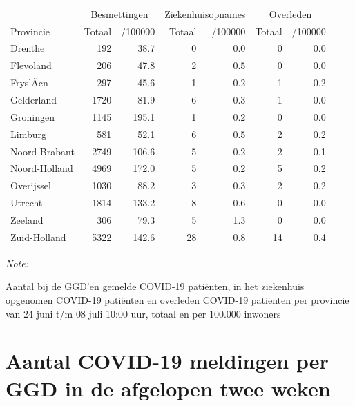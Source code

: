 \documentclass[
  english,
  man,floatsintext]{apa6}
\begin{document}
\begin{table}
\centering
\begin{threeparttable}
\begin{tabular}{lrrrrrr}
\toprule
\multicolumn{1}{c}{ } & \multicolumn{2}{c}{Besmettingen} & \multicolumn{2}{c}{Ziekenhuisopnames} & \multicolumn{2}{c}{Overleden} \\
\cmidrule(l{3pt}r{3pt}){2-3} \cmidrule(l{3pt}r{3pt}){4-5} \cmidrule(l{3pt}r{3pt}){6-7}
Provincie & Totaal & /100000 & Totaal & /100000 & Totaal & /100000\\
\midrule
Drenthe & 192 & 38.7 & 0 & 0.0 & 0 & 0.0\\
Flevoland & 206 & 47.8 & 2 & 0.5 & 0 & 0.0\\
FryslÃ¢n & 297 & 45.6 & 1 & 0.2 & 1 & 0.2\\
Gelderland & 1720 & 81.9 & 6 & 0.3 & 1 & 0.0\\
Groningen & 1145 & 195.1 & 1 & 0.2 & 0 & 0.0\\
Limburg & 581 & 52.1 & 6 & 0.5 & 2 & 0.2\\
Noord-Brabant & 2749 & 106.6 & 5 & 0.2 & 2 & 0.1\\
Noord-Holland & 4969 & 172.0 & 5 & 0.2 & 5 & 0.2\\
Overijssel & 1030 & 88.2 & 3 & 0.3 & 2 & 0.2\\
Utrecht & 1814 & 133.2 & 8 & 0.6 & 0 & 0.0\\
Zeeland & 306 & 79.3 & 5 & 1.3 & 0 & 0.0\\
Zuid-Holland & 5322 & 142.6 & 28 & 0.8 & 14 & 0.4\\
\bottomrule
\end{tabular}
\begin{tablenotes}
\item \textit{Note: } 
\item Aantal bij de GGD’en gemelde COVID-19 patiënten, in het ziekenhuis opgenomen COVID-19 patiënten en overleden COVID-19 patiënten per provincie van 24 juni t/m 08 juli 10:00 uur, totaal en per 100.000 inwoners
\end{tablenotes}
\end{threeparttable}
\end{table}

\newpage

\hypertarget{aantal-covid-19-meldingen-per-ggd-in-de-afgelopen-twee-weken}{%
\section{Aantal COVID-19 meldingen per GGD in de afgelopen twee weken}\label{aantal-covid-19-meldingen-per-ggd-in-de-afgelopen-twee-weken}}
\end{document}
